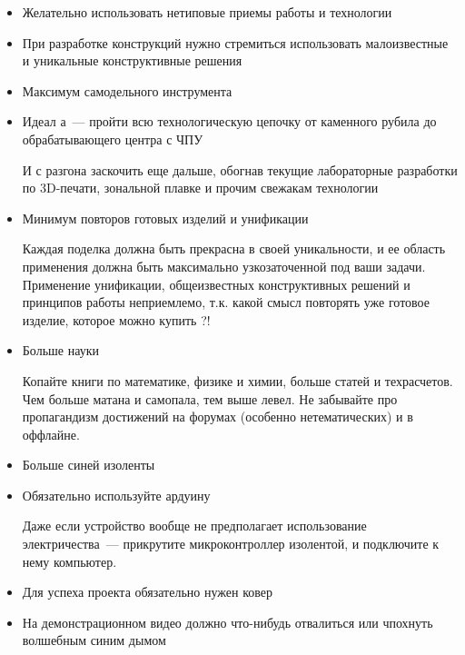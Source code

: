 \documentclass{magazine}
\begin{document}
{\begin{itemize}
В процессе неплохо попутно изобрести пару уникальных языков программирования,
написать на них операционную систему и комплект программного обеспечения.

\item Желательно использовать нетиповые приемы работы и технологии

\item При разработке конструкций нужно стремиться использовать малоизвестные и
уникальные конструктивные решения

\item Максимум самодельного инструмента

\item Идеал \scr а\ --- пройти всю технологическую цепочку от каменного 
рубила до обрабатывающего центра с ЧПУ

И с разгона заскочить еще дальше, обогнав текущие лабораторные разработки по
3D-печати, зональной плавке и прочим свежакам технологии

\item Минимум повторов готовых изделий и унификации

Каждая поделка должна быть прекрасна в своей уникальности, и ее область
применения должна быть максимально узкозаточенной под ваши задачи. Применение
унификации, общеизвестных конструктивных решений и принципов работы неприемлемо,
т.к. какой смысл повторять уже готовое изделие, которое можно купить ?!

\item Больше науки

Копайте книги по математике, физике и химии, больше статей и техрасчетов.
Чем больше матана и самопала, тем выше левел. Не забывайте про пропагандизм
достижений на форумах (особенно нетематических) и в оффлайне.

\item Больше синей изоленты

\item Обязательно используйте ардуину

Даже если устройство вообще не предполагает использование электричества\ ---
прикрутите микроконтроллер изолентой, и подключите к нему компьютер.

\item Для успеха проекта обязательно нужен ковер

\item На демонстрационном видео должно что-нибудь отвалиться или чпохнуть
волшебным синим дымом
   
\end{itemize}	

}{}
\end{document}
